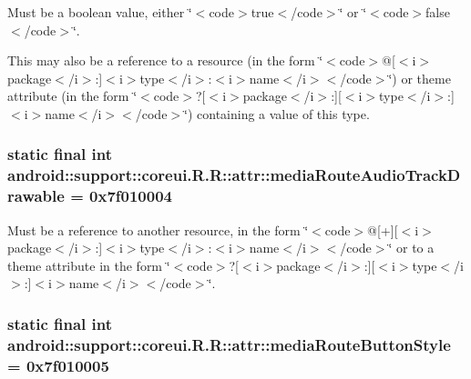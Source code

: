 Must be a boolean value, either \char`\"{}$<$code$>$true$<$/code$>$\char`\"{} or \char`\"{}$<$code$>$false$<$/code$>$\char`\"{}. 

This may also be a reference to a resource (in the form \char`\"{}$<$code$>$@\mbox{[}$<$i$>$package$<$/i$>$:\mbox{]}$<$i$>$type$<$/i$>$:$<$i$>$name$<$/i$>$$<$/code$>$\char`\"{}) or theme attribute (in the form \char`\"{}$<$code$>$?\mbox{[}$<$i$>$package$<$/i$>$:\mbox{]}\mbox{[}$<$i$>$type$<$/i$>$:\mbox{]}$<$i$>$name$<$/i$>$$<$/code$>$\char`\"{}) containing a value of this type. \hypertarget{classandroid_1_1support_1_1coreui_1_1_r_1_1attr_5e6734da61430541dd2408ba5ea965eb}{
\subsubsection[{mediaRouteAudioTrackDrawable}]{\setlength{\rightskip}{0pt plus 5cm}static final int android::support::coreui.R.R::attr::mediaRouteAudioTrackDrawable = 0x7f010004}}
\label{classandroid_1_1support_1_1coreui_1_1_r_1_1attr_5e6734da61430541dd2408ba5ea965eb}


Must be a reference to another resource, in the form \char`\"{}$<$code$>$@\mbox{[}+\mbox{]}\mbox{[}$<$i$>$package$<$/i$>$:\mbox{]}$<$i$>$type$<$/i$>$:$<$i$>$name$<$/i$>$$<$/code$>$\char`\"{} or to a theme attribute in the form \char`\"{}$<$code$>$?\mbox{[}$<$i$>$package$<$/i$>$:\mbox{]}\mbox{[}$<$i$>$type$<$/i$>$:\mbox{]}$<$i$>$name$<$/i$>$$<$/code$>$\char`\"{}. \hypertarget{classandroid_1_1support_1_1coreui_1_1_r_1_1attr_f8aa9b66ffd14b185dde9b7c3cebc3fa}{
\subsubsection[{mediaRouteButtonStyle}]{\setlength{\rightskip}{0pt plus 5cm}static final int android::support::coreui.R.R::attr::mediaRouteButtonStyle = 0x7f010005}}
\label{classandroid_1_1support_1_1coreui_1_1_r_1_1attr_f8aa9b66ffd14b185dde9b7c3cebc3fa}


